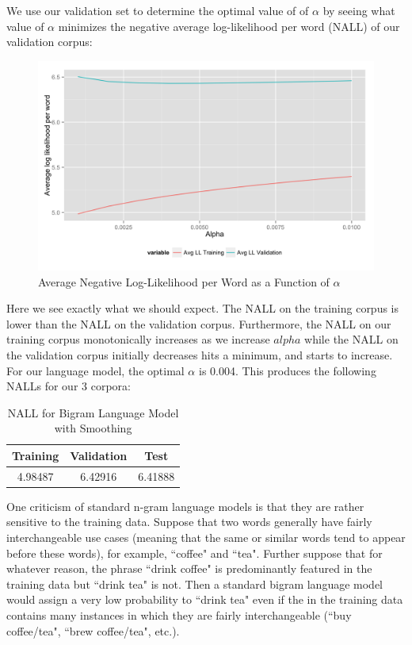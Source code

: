 \documentclass[fleqn,12pt]{SelfArx} %
\begin{document}
We use our validation set to determine the optimal value of of $\alpha$ by seeing what value of $\alpha$ minimizes the negative average log-likelihood per word (NALL) of our validation corpus:
\begin{figure}[ht]\centering
\includegraphics[width=\linewidth]{bigram_add_a.png}
\caption{Average Negative Log-Likelihood per Word as a Function of $\alpha$}
\label{fig:fre_hist}
\end{figure}
Here we see exactly what we should expect. The NALL on the training corpus is lower than the NALL on the validation corpus. Furthermore, the NALL on our training corpus monotonically increases as we increase $alpha$ while the NALL on the validation corpus initially decreases hits a minimum, and starts to increase. For our language model, the optimal $\alpha$ is 0.004. This produces the following NALLs for our 3 corpora:

\begin{table}[hbt]
\caption{NALL for Bigram Language Model with Smoothing}
\centering
\begin{tabular}{ccc}
\toprule
Training &  Validation & Test\\
\midrule
4.98487 & 6.42916 &  6.41888\\
\bottomrule
\end{tabular}
\end{table}

One criticism of standard n-gram language models is that they are rather sensitive to the training data. Suppose that two words generally have fairly interchangeable use cases (meaning that the same or similar words tend to appear before these words), for example, ``coffee" and ``tea". Further suppose that for whatever reason, the phrase ``drink coffee" is predominantly featured in the training data but ``drink tea" is not. Then a standard bigram language model would assign a very low probability to ``drink tea" even if the in the training data contains many instances in which they are fairly interchangeable (``buy coffee/tea", ``brew coffee/tea", etc.).
\end{document}
